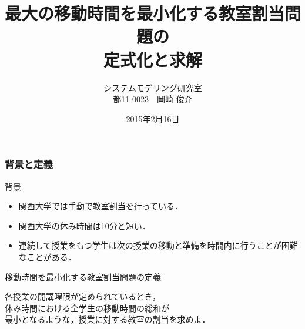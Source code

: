\documentclass[dvipdfmx,12pt]{beamer}
\title{最大の移動時間を最小化する教室割当問題の\\定式化と求解}
\author{\Large {システムモデリング研究室\\都11-0023　岡崎 俊介}}
\date{{\Large 2015年2月16日}}
\begin{document}
\begin{frame}\frametitle{}
\titlepage
\end{frame}

\begin{frame}                  %
\titlepage{}                 %
\end{frame}


\begin{frame}
  \frametitle{\LARGE 背景と定義}
\vspace{2.0mm}

\fi
\begin{itembox}[c]{\Large{背景}}
\begin{center}
\begin{itemize}
\item{\large{関西大学では手動で教室割当を行っている．}}
\item{\large{関西大学の休み時間は10分と短い．}}
\item{\large{連続して授業をもつ学生は次の授業の移動と準備を時間内に行うことが困難なことがある．}}
\end{itemize}
\end{center}
\end{itembox}
\vspace{1.0mm}
\begin{itembox}[c]{\Large{移動時間を最小化する教室割当問題の定義}}
\begin{center}
\large{各授業の開講曜限が定められているとき，\\休み時間における全学生の移動時間の総和が\\最小となるような，授業に対する教室の割当を求めよ．}
\end{center}
\end{itembox}
\vspace{2.0mm}


\end{frame}
\end{document}
